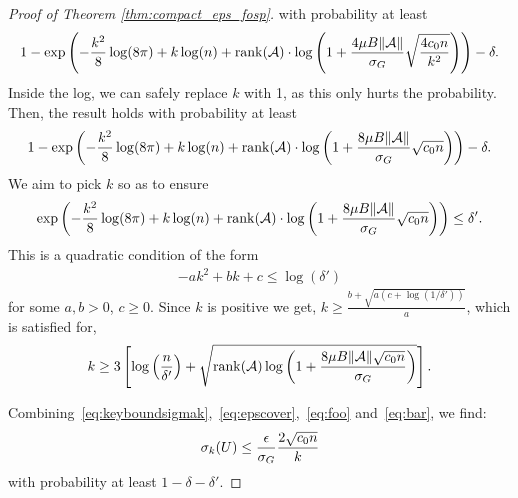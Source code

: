 \begin{proof}[Proof of Theorem \ref{thm:compact_eps_fosp}]
	with probability at least
	$$
		1 - \exp \left( - \frac{k^2}{8}\log(8\pi) + k\log(n) + \operatorname{rank}(\mathcal{A}) \cdot \log\left( 1 + \frac{4 \mu  B\|\mathcal{A}\|}{\sigma_G} \sqrt{\frac{4c_0 n}{k^2}} \right) \right) - \delta.
	$$
	Inside the log, we can safely replace $k$ with 1, as this only hurts the probability. Then, the result holds with probability at least
	$$
		1 - \exp \left( - \frac{k^2}{8}\log(8\pi) + k\log(n) + \operatorname{rank}(\mathcal{A}) \cdot \log\left( 1 + \frac{8 \mu  B\|\mathcal{A}\|}{\sigma_G} \sqrt{c_0 n} \right) \right) - \delta.
	$$
	We aim to pick $k$ so as to ensure
	\begin{align*}
		\exp \left( - \frac{k^2}{8}\log(8\pi) + k\log(n) + \operatorname{rank}(\mathcal{A}) \cdot \log\left( 1 + \frac{8 \mu  B\|\mathcal{A}\|}{\sigma_G} \sqrt{c_0 n} \right) \right) \leq \delta'.
	\end{align*}
	This is a quadratic condition of the form
	\begin{align*}
		-ak^2 + bk + c \leq \log(\delta')
	\end{align*}
	for some $a, b > 0$, $c \geq 0$. Since $k$ is positive we get, $k \geq \frac{b+\sqrt{a (c+\log(1/\delta'))}}{a}$, which is satisfied for, $$ k \geq  3\left[\log\left(\frac{n}{\delta'}\right) + \sqrt{ \operatorname{rank}(\mathcal{A})   \log\left( 1 + \frac{8 \mu B\|\mathcal{A}\| \sqrt{c_0  n}}{\sigma_G } \right) }  \right].$$
	
	
	Combining~\eqref{eq:keyboundsigmak},~\eqref{eq:epscover},~\eqref{eq:foo} and~\eqref{eq:bar}, we find:
	\begin{align*}
		\sigma_k(U) \leq \frac{ \epsilon}{\sigma_G } \frac{2\sqrt{c_0 n}}{k}
	\end{align*}
	 with probability at least $1-\delta-\delta'$.
%	
%	
\end{proof}



